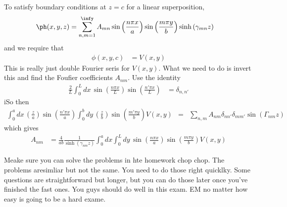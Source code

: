 To satisfy boundary conditions at $z=c$ for a linear superposition,
\begin{align}
    \ph(x, y, z)
    &=
    \sum_{n,m=1}^\infy
    A_{mn}
    \sin\left( \frac{n \pi x}{a} \right)
    \sin\left( \frac{m \pi y}{b} \right)
    \sinh\left( \gamma_{mn} z \right)
\end{align}
and we require that
\begin{align}
    \phi\left( x, y, c \right) &= V\left( x, y \right)
\end{align}
This is really just double Fourier seris for $V(x, y)$.
What we need to do is invert this and find the Foufier coefficients 
$A_{nm}$.
Use the identity
\begin{align}
    \frac{2}{L}\int_{0}^{L} dx\,
    \sin\left( \frac{n\pi x}{L} \right)
    \sin\left( \frac{n'\pi x}{L} \right)
    &=
    \delta_{n,n'}
\end{align}
iSo then
\begin{align}
    \int_{0}^{a}dx\,
    \left( \frac{z}{a} \right)
    \sin\left( \frac{n'\pi x}{a} \right)
    \int_{0}^{b}dy\,
    \left( \frac{z}{b} \right)
    \sin\left( \frac{m' \pi y}{b} \right)
    V\left( x, y \right)
    &=& 
    \sum_{n,m}
    A_{nm} \delta_{nn'} \delta_{mm'}
    \sin\left( \Gamma_{nm} z \right)
\end{align}
which gives
\begin{align}
    A_{nm}
    &=
    \frac{4}{ab}
    \frac{1}{\sinh\left( \gamma_{nm} z \right)}
    \int_{0}^{a} dx
    \int_{0}^{L} dy\,
    \sin\left( \frac{n\pi x}{a} \right)
    \sin\left( \frac{m\pi y}{b} \right)
    V\left( x, y \right)
\end{align}

Meake sure you can solve the problems in hte homework chop chop.
The problems aresimliar but not the same.
You need to do those right quicklky.
Some questions are straightforward but longer,
but you can do those later once you've finished the fast ones.
You guys should do well in this exam.
EM no matter how easy is going to be a hard exame.
